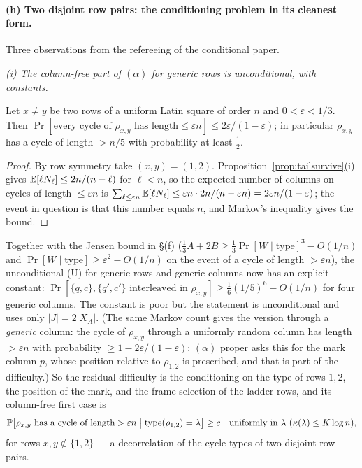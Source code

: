 \paragraph{(h) Two disjoint row pairs: the conditioning problem in its
cleanest form.}  Three observations from the refereeing of the
conditional paper.

\emph{(i) The column-free part of $(\alpha)$ for generic rows is
unconditional, with constants.}
\begin{proposition}\label{prop:genericlong}
Let $x\ne y$ be two rows of a uniform Latin square of order $n$ and
$0<\varepsilon<1/3$.  Then
$\Pr[\text{every cycle of }\rho_{x,y}\text{ has length}\le\varepsilon n]
\le2\varepsilon/(1-\varepsilon)$; in particular $\rho_{x,y}$ has a
cycle of length $>n/5$ with probability at least $\tfrac12$.
\end{proposition}
\begin{proof}
By row symmetry take $(x,y)=(1,2)$.  Proposition~\ref{prop:tailsurvive}(i)
gives $\E[\ell N_\ell]\le2n/(n-\ell)$ for $\ell<n$, so the expected
number of columns on cycles of length $\le\varepsilon n$ is
$\sum_{\ell\le\varepsilon n}\E[\ell N_\ell]\le\varepsilon n\cdot2n/(n-\varepsilon n)
=2\varepsilon n/(1-\varepsilon)$; the event in question is that this
number equals $n$, and Markov's inequality gives the bound.
\end{proof}
\noindent Together with the Jensen bound in \S(f)
($\tfrac13A+2B\ge\tfrac13\Pr[W\mid\text{type}]^3-O(1/n)$ and
$\Pr[W\mid\text{type}]\ge\varepsilon^2-O(1/n)$ on the event of a cycle
of length $>\varepsilon n$), the unconditional (U) for generic rows and
generic columns now has an explicit constant:
$\Pr[\{q,c\},\{q',c'\}\text{ interleaved in }\rho_{x,y}]\ge\tfrac16(1/5)^6-O(1/n)$
for four generic columns.  The constant is poor but the statement is
unconditional and uses only $|J|=2|X_A|$.  (The same Markov count
gives the version through a \emph{generic} column: the cycle of
$\rho_{x,y}$ through a uniformly random column has length
$>\varepsilon n$ with probability $\ge1-2\varepsilon/(1-\varepsilon)$;
$(\alpha)$ proper asks this for the mark column $p$, whose position
relative to $\rho_{1,2}$ is prescribed, and that is part of the
difficulty.)  So the residual difficulty is the conditioning on the
type of rows $1,2$, the position of the mark, and the frame selection
of the ladder rows, and its column-free first case is
\begin{equation}\label{eq:tworows}
\Pr\bigl[\rho_{x,y}\text{ has a cycle of length}>\varepsilon n\bigm|\operatorname{type}(\rho_{1,2})=\lambda\bigr]\ge c
\quad\text{uniformly in }\lambda\ (\kappa(\lambda)\le K\log n),
\end{equation}
for rows $x,y\notin\{1,2\}$ --- a decorrelation of the cycle types of
two disjoint row pairs.

